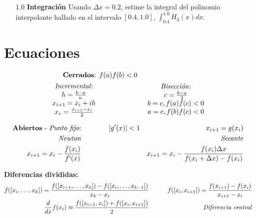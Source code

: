 \documentclass[12pt]{article}
\begin{document}
\begin{enumerate}[leftmargin=*,widest=9]
\begin{itemize}
    \vspace{5cm}

    \item[$1.0$] \textbf{Integración} Usando $\Delta x = 0.2$, estime la integral del polinomio interpolante hallado en el intervalo $\left[0.4, 1.0\right]$, $\int_{0.4}^{1.0} H_{3}(x)dx$.

    \end{itemize}

  \end{enumerate}

  \clearpage

  \section*{Ecuaciones}

\begin{align*}
  \text{\textbf{Cerrados}: } & f(a)f(b)<0 &  \\
  \begin{array}{c}
  \text{\textit{Incremental}:}\\
  h = \frac{b-a}{n} \\
  x_{i+1} = x_i + ih\\
  x_r = \frac{x_{i+1}-x_i}{2}
  \end{array}
  & \qquad \qquad &
  \begin{array}{c}
  \text{\textit{Bisección}:}\\
  c = \frac{b-a}{2}\\
  b = c, f(a)f(c)<0\\
  a = c, f(b)f(c)<0
  \end{array}
\end{align*}

\begin{align*}
  \text{\textbf{Abiertos} - \textit{Punto fijo}:}& \qquad \qquad |g^\prime (x)| < 1 & x_{i+1} = g(x_i) \\
  \text{\textit{Newton}} & & \text{\textit{Secante}} \\
  x_{i+1} = x_i - \frac{f(x_i)}{f^\prime(x)} & \qquad \qquad &
    x_{i+1} = x_i - \frac{f(x_i)\Delta x}{f(x_i+\Delta x)-f(x_i)}
\end{align*}

  \textbf{Diferencias divididas:}
  \begin{align*}
  f([x_i, \ldots, x_k]) = \frac{f([x_{i+1}, \ldots, x_k]) - f([x_i, \ldots, x_{k-1}])}{x_k - x_i} & \qquad & f([x_i, x_{i+1}])  =  \frac{f(x_{i+1})-f(x_i)}{x_{i+1}-x_i} \\
  \frac{d}{dx}f(x_i) \approx \frac{f([x_{i-1}, x_i])+f([x_{i}, x_{i+1}])}{2} & & \text{ \textit{Diferencia central}}
  \end{align*}
\end{document}
